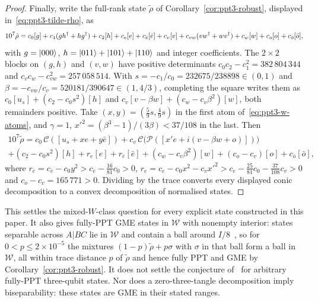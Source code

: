 \begin{proof}
Finally, write the full-rank state $\tilde\rho$ of Corollary~\ref{cor:ppt3-robust}, displayed in~\eqref{eq:ppt3-tilde-rho},
as
\[
 10^7\tilde\rho=c_0[g]+c_1(gh^{\dagger}+hg^{\dagger})+c_2[h]+c_e[e]+c_{\bar e}[\bar e]+c_v[v]+c_{vw}(vw^{\dagger}+wv^{\dagger})+c_w[w]+c_o[o]+c_{\bar o}[\bar o],
\]
with $g=\lvert000\rangle$, $h=\lvert011\rangle+\lvert101\rangle+\lvert110\rangle$ and integer coefficients. The $2\times2$ blocks on $(g,h)$ and
$(v,w)$ have positive determinants $c_0c_2-c_1^2=382\,804\,344$ and $c_vc_w-c_{vw}^2=257\,058\,514$. With
$s=-c_1/c_0=232675/238898\in(0,1)$ and $\beta=-c_{vw}/c_v=520181/390647\in(1,4/3)$, completing the square writes them as
$c_0[u_s]+(c_2-c_0s^2)[h]$ and $c_v[v-\beta w]+(c_w-c_v\beta^2)[w]$, both remainders positive. Take $(x,y)=(\tfrac59s,\tfrac49s)$
in the first atom of~\eqref{eq:ppt3-w-atoms}, and $\gamma=1$, $x'^2=(\beta^3-1)/(3\beta)<37/108$ in the last. Then
\begin{multline*}
 10^7\tilde\rho=c_0\,\mathcal C([u_s+xe+y\bar e])+c_v\,\mathcal C\bigl(\mathcal P([x'e+i(v-\beta w+o)])\bigr)\\
 +(c_2-c_0s^2)[h]+r_e[e]+r_{\bar e}[\bar e]+(c_w-c_v\beta^2)[w]+(c_o-c_v)[o]+c_{\bar o}[\bar o],
\end{multline*}
where $r_{\bar e}=c_{\bar e}-c_0y^2>c_{\bar e}-\tfrac{16}{81}c_0>0$, $r_e=c_e-c_0x^2-c_vx'^2>c_e-\tfrac{25}{81}c_0-\tfrac{37}{108}c_v>0$
and $c_o-c_v=165\,771>0$.
Dividing by the trace converts every displayed conic decomposition to a convex decomposition of normalised states.
\end{proof}

\begin{remark}\label{rem:ppt3-w-class-scope}
This settles the mixed-$W$-class question for every explicit state constructed in this paper. It also gives fully-PPT GME
states in $\mathcal W$ with nonempty interior: states separable across $A|BC$ lie in $\mathcal W$ and contain a ball around
$I/8$~\cite{GB}, so for $0<p\le2\times10^{-5}$ the mixtures $(1-p)\tilde\rho+p\sigma$ with $\sigma$ in that ball form a ball
in $\mathcal W$, all within trace distance $p$ of $\tilde\rho$ and hence fully PPT and GME by Corollary~\ref{cor:ppt3-robust}.
It does not settle the conjecture of~\cite{ABLS} for arbitrary fully-PPT three-qubit states. Nor does a zero-three-tangle
decomposition imply biseparability: these states are GME in their stated ranges.
\end{remark}
